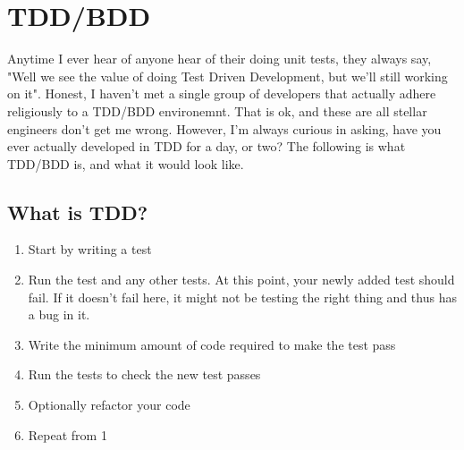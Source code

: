 \maketitle{}
\section{ TDD/BDD }

Anytime I ever hear of anyone hear of their doing unit tests, they always say,
"Well we see the value of doing Test Driven Development, but we'll still working
on it". Honest, I haven't met a single group of developers that actually adhere
religiously to a TDD/BDD environemnt. That is ok, and these are all stellar
engineers don't get me wrong. However, I'm always curious in asking, have you
ever actually developed in TDD for a day, or two? The following is what TDD/BDD
is, and what it would look like.

\subsection{ What is TDD? }

\begin{enumerate}
  \item Start by writing a test
  \item Run the test and any other tests. At this point, your newly added test
   should fail. If it doesn’t fail here, it might not be testing the right
   thing and thus has a bug in it.
  \item Write the minimum amount of code required to make the test pass
  \item Run the tests to check the new test passes
  \item Optionally refactor your code
  \item Repeat from 1
\end{enumerate}


